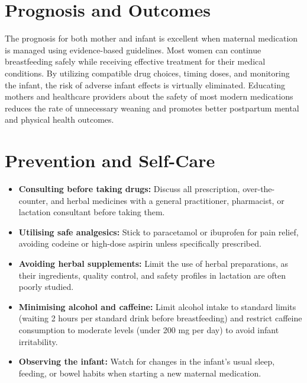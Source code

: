 \section*{Prognosis and Outcomes}
The prognosis for both mother and infant is excellent when maternal medication is managed using evidence-based guidelines. Most women can continue breastfeeding safely while receiving effective treatment for their medical conditions. By utilizing compatible drug choices, timing doses, and monitoring the infant, the risk of adverse infant effects is virtually eliminated. Educating mothers and healthcare providers about the safety of most modern medications reduces the rate of unnecessary weaning and promotes better postpartum mental and physical health outcomes.

\section*{Prevention and Self-Care}
\begin{itemize}
    \item \textbf{Consulting before taking drugs:} Discuss all prescription, over-the-counter, and herbal medicines with a general practitioner, pharmacist, or lactation consultant before taking them.
    \item \textbf{Utilising safe analgesics:} Stick to paracetamol or ibuprofen for pain relief, avoiding codeine or high-dose aspirin unless specifically prescribed.
    \item \textbf{Avoiding herbal supplements:} Limit the use of herbal preparations, as their ingredients, quality control, and safety profiles in lactation are often poorly studied.
    \item \textbf{Minimising alcohol and caffeine:} Limit alcohol intake to standard limits (waiting 2 hours per standard drink before breastfeeding) and restrict caffeine consumption to moderate levels (under 200 mg per day) to avoid infant irritability.
    \item \textbf{Observing the infant:} Watch for changes in the infant's usual sleep, feeding, or bowel habits when starting a new maternal medication.
\end{itemize}


